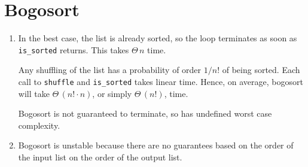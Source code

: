 \documentclass[11pt]{article}
\begin{document}
\section{Bogosort}
\begin{enumerate}
\item
  In the best case, the list is already sorted, so the loop terminates as soon as \texttt{is\_sorted} returns. This takes \(\Theta\,n\) time.

  Any shuffling of the list has a probability of order \(1/n!\) of being sorted. Each call to \texttt{shuffle} and \texttt{is\_sorted} takes linear time. Hence, on average, bogosort will take \(\Theta\,\left(n!\cdot n\right)\), or simply \(\Theta\,\left(n!\right)\), time.

  Bogosort is not guaranteed to terminate, so has undefined worst case complexity.
\item Bogosort is unstable because there are no guarantees based on the order of the input list on the order of the output list.
\end{enumerate}
\end{document}

